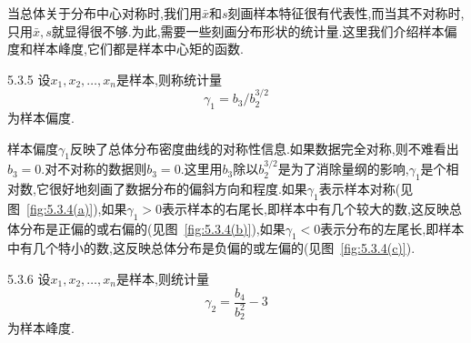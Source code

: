 当总体关于分布中心对称时,我们用$\bar x$和$s$刻画样本特征很有代表性,而当其不对称时,只用$\bar x,s$就显得很不够.为此,需要一些刻画分布形状的统计量.这里我们介绍样本偏度和样本峰度,它们都是样本中心矩的函数.
\begin{definition}{}{5.3.5}
设$x_1,x_2,\dotsc,x_n$是样本,则称统计量
\begin{equation}\label{eq:5.3.11}
\gamma_1=b_3/b_2^{3/2}
\end{equation}
为样本偏度.
\end{definition}
样本偏度$\gamma_1$反映了总体分布密度曲线的对称性信息.如果数据完全对称,则不难看出$b_3=0$.对不对称的数据则$b_3=0$.这里用$b_3$除以$b_2^{3/2}$是为了消除量纲的影响,$\gamma_1$是个相对数,它很好地刻画了数据分布的偏斜方向和程度.如果$\gamma_1$表示样本对称(见图~\ref{fig:5.3.4(a)}),如果$\gamma_1>0$表示样本的右尾长,即样本中有几个较大的数,这反映总体分布是正偏的或右偏的(见图~\ref{fig:5.3.4(b)}),如果$\gamma_1<0$表示分布的左尾长,即样本中有几个特小的数,这反映总体分布是负偏的或左偏的(见图~\ref{fig:5.3.4(c)}).
\begin{definition}{}{5.3.6}
设$x_1,x_2,\dotsc,x_n$是样本,则统计量
\begin{equation}\label{eq:5.3.12}
\gamma_2=\frac{b_4}{b_2^2}-3
\end{equation}
为样本峰度.
\end{definition}

